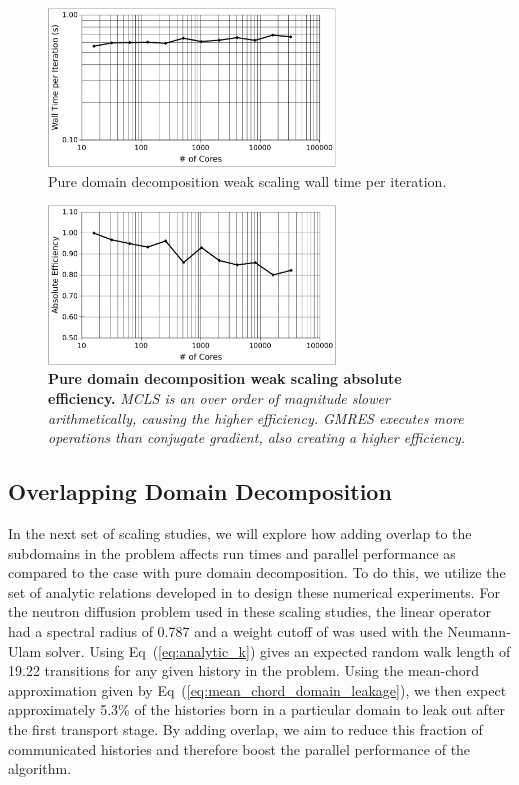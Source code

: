 \documentclass{snamc2013}
\begin{document}
\begin{figure}[p!]
  \begin{center}
    \includegraphics[width=3in]{titan_pure_weak_time.pdf}
  \end{center}
  \caption{Pure domain decomposition weak scaling wall time
      per iteration.}
  \label{fig:titan_pure_weak_time}
\end{figure}

\begin{figure}[h!]
  \begin{center}
    \includegraphics[width=3in]{titan_weak_absolute.pdf}
  \end{center}
  \caption{\textbf{Pure domain decomposition weak scaling absolute
      efficiency.} \textit{MCLS is an over order of magnitude slower
      arithmetically, causing the higher efficiency. GMRES executes
      more operations than conjugate gradient, also creating a higher
      efficiency.}}
  \label{fig:titan_weak_absolute}
\end{figure}

\subsection{Overlapping Domain Decomposition}
\label{subsec:overlapping_domain_decomp}
In the next set of scaling studies, we will explore how adding overlap
to the subdomains in the problem affects run times and parallel
performance as compared to the case with pure domain decomposition. To
do this, we utilize the set of analytic relations developed in
\cite{slattery_spectral_2013} to design these numerical
experiments. For the neutron diffusion problem used in these scaling
studies, the linear operator had a spectral radius of 0.787 and a
weight cutoff of  was used with the Neumann-Ulam
solver. Using Eq~(\ref{eq:analytic_k}) gives an expected random walk
length of 19.22 transitions for any given history in the
problem. Using the mean-chord approximation given by
Eq~(\ref{eq:mean_chord_domain_leakage}), we then expect approximately
5.3\% of the histories born in a particular domain to leak out after
the first transport stage. By adding overlap, we aim to reduce this
fraction of communicated histories and therefore boost the parallel
performance of the algorithm.
\end{document}
